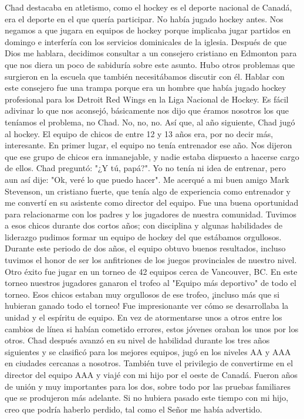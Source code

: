 \documentclass[twoside, 12pt]{book}
\begin{document}
Chad destacaba en atletismo, como el hockey es el deporte nacional de Canadá, era el deporte en el que quería participar. No había jugado hockey antes. Nos negamos a que jugara en equipos de hockey porque implicaba jugar partidos en domingo e interfería con los servicios dominicales de la iglesia. Después de que Dios me hablara, decidimos consultar a un consejero cristiano en Edmonton para que nos diera un poco de sabiduría sobre este asunto. Hubo otros problemas que surgieron en la escuela que también necesitábamos discutir con él. Hablar con este consejero fue una trampa porque era un hombre que había jugado hockey profesional para los Detroit Red Wings en la Liga Nacional de Hockey. Es fácil adivinar lo que nos aconsejó, básicamente nos dijo que éramos nosotros los que teníamos el problema, no Chad. No, no, no. Así que, al año siguiente, Chad jugó al hockey. El equipo de chicos de entre 12 y 13 años era, por no decir más, interesante. En primer lugar, el equipo no tenía entrenador ese año. Nos dijeron que ese grupo de chicos era inmanejable, y nadie estaba dispuesto a hacerse cargo de ellos. Chad preguntó: "¿Y tú, papá?". Yo no tenía ni idea de entrenar, pero aun así dije: "Ok, veré lo que puedo hacer". Me acerqué a mi buen amigo Mark Stevenson, un cristiano fuerte, que tenía algo de experiencia como entrenador y me convertí en su asistente como director del equipo. Fue una buena oportunidad para relacionarme con los padres y los jugadores de nuestra comunidad. Tuvimos a esos chicos durante dos cortos años; con disciplina y algunas habilidades de liderazgo pudimos formar un equipo de hockey del que estábamos orgullosos.\\

Durante este periodo de dos años, el equipo obtuvo buenos resultados, incluso tuvimos el honor de ser los anfitriones de los juegos provinciales de nuestro nivel. Otro éxito fue jugar en un torneo de 42 equipos cerca de Vancouver, BC. En este torneo nuestros jugadores ganaron el trofeo al "Equipo más deportivo" de todo el torneo. Esos chicos estaban muy orgullosos de ese trofeo, ¡incluso más que si hubieran ganado todo el torneo! Fue impresionante ver cómo se desarrollaba la unidad y el espíritu de equipo. En vez de atormentarse unos a otros entre los cambios de línea si habían cometido errores, estos jóvenes oraban los unos por los otros. Chad después avanzó en su nivel de habilidad durante los tres años siguientes y se clasificó para los mejores equipos, jugó en los niveles AA y AAA en ciudades cercanas a nosotros. También tuve el privilegio de convertirme en el director del equipo AAA y viajé con mi hijo por el oeste de Canadá. Fueron años de unión y muy importantes para los dos, sobre todo por las pruebas familiares que se produjeron más adelante. Si no hubiera pasado este tiempo con mi hijo, creo que podría haberlo perdido, tal como el Señor me había advertido.\\
\end{document}
